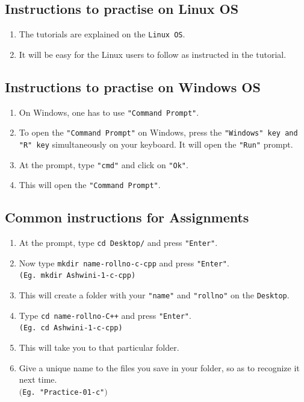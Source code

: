\documentclass[11pt]{article}
\newenvironment{enumcpt}{\begin{enumerate} \topsep 0pt \partopsep 0pt 
	\parsep 0pt
	\itemsep 0pt \leftmargin -1in \rightmargin 0pt
}{\end{enumerate}}
\begin{document}
\begin{multicols}{2}
\begin{enumcpt}
\vspace*{0.5in}

\subsection {Instructions to practise on Linux OS}
\begin{enumcpt}
	\item The tutorials are explained on the {\tt Linux OS}.
	\item It will be easy for the Linux users to follow as instructed in the tutorial.
\end{enumcpt}

\subsection {Instructions to practise on Windows OS}
\begin{enumcpt}
	\item On Windows, one has to use {\tt "Command Prompt"}.
	\item To open the  {\tt "Command Prompt"} on Windows, press the {\tt  "Windows" key and "R"  key} simultaneously on your keyboard.  It will open the {\tt "Run"} prompt.
	\item At the prompt, type {\tt "cmd"} and click on {\tt "Ok"}.
	\item This will open the {\tt "Command Prompt"}.			
\end{enumcpt}

\subsection {Common instructions for Assignments}
\begin{enumcpt}
  	\item At the prompt, type {\tt cd Desktop/} and press {\tt "Enter"}.
  	\item Now type {\tt mkdir name-rollno-c-cpp} and press {\tt "Enter"}.
  	\\ {\tt (Eg. mkdir Ashwini-1-c-cpp)}
  	\item This will create a folder with your {\tt "name"} and {\tt "rollno"} on the {\tt Desktop}.
  	\item Type {\tt cd name-rollno-C++} and press {\tt "Enter"}.
  	\\ {\tt (Eg. cd Ashwini-1-c-cpp)}
		 \item This will take you to that particular folder.
  	\item Give a unique name to the files you save in your folder, so as to recognize it next time. \\ {\tt $($Eg. "Practice-01-c"$)$}
\vspace*{1in}


\end{enumcpt}
\end{enumcpt}
\end{multicols}
\end{document}
